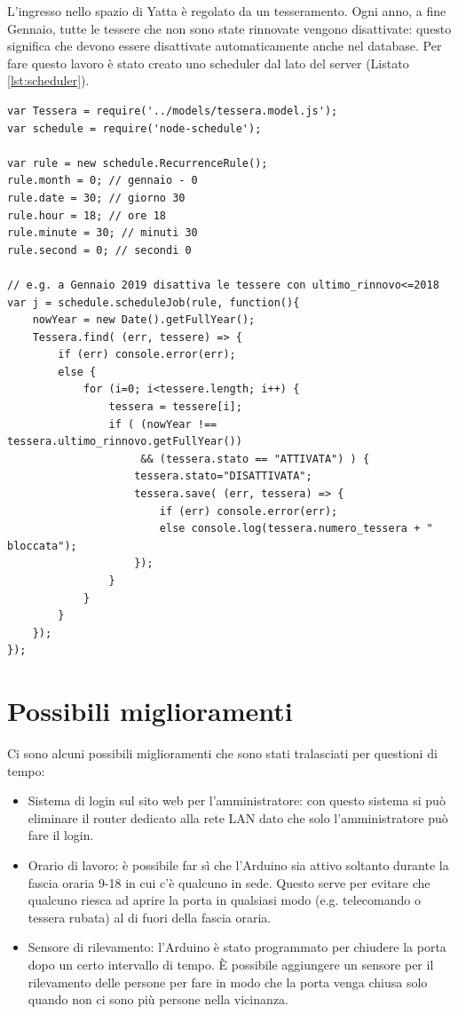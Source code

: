 \documentclass[12pt]{report}
\begin{document}
L'ingresso nello spazio di Yatta è regolato da un tesseramento. Ogni anno, a fine Gennaio, tutte le tessere che non sono state rinnovate vengono disattivate: questo significa che devono essere disattivate automaticamente anche nel database.
Per fare questo lavoro è stato creato uno scheduler dal lato del server (Listato \ref{lst:scheduler}).
\begin{lstlisting}[caption={Implementazione di uno scheduler che disattiva automaticamente le tessere non rinnovate. Questa funzione viene eseguita una volta all'anno e disattiva tutte le tessere ancora attivate e non iscritte all'anno corrente.}, label={lst:scheduler}]
var Tessera = require('../models/tessera.model.js');
var schedule = require('node-schedule');

var rule = new schedule.RecurrenceRule();
rule.month = 0; // gennaio - 0
rule.date = 30; // giorno 30
rule.hour = 18; // ore 18
rule.minute = 30; // minuti 30
rule.second = 0; // secondi 0

// e.g. a Gennaio 2019 disattiva le tessere con ultimo_rinnovo<=2018
var j = schedule.scheduleJob(rule, function(){
	nowYear = new Date().getFullYear();
	Tessera.find( (err, tessere) => {
		if (err) console.error(err);
		else {
			for (i=0; i<tessere.length; i++) {
				tessera = tessere[i];
				if ( (nowYear !== tessera.ultimo_rinnovo.getFullYear()) 
				     && (tessera.stato == "ATTIVATA") ) {
					tessera.stato="DISATTIVATA";
					tessera.save( (err, tessera) => {
						if (err) console.error(err);
						else console.log(tessera.numero_tessera + " bloccata");
					});
				}
			}
		}
	});
});
\end{lstlisting}

%
\section{Possibili miglioramenti}
%

Ci sono alcuni possibili miglioramenti che sono stati tralasciati per questioni di tempo:

\begin{itemize}
	\item Sistema di login sul sito web per l'amministratore: con questo sistema si può eliminare il router dedicato alla rete LAN dato che solo l'amministratore può fare il login. 
	\item Orario di lavoro: è possibile far sì che l'Arduino sia attivo soltanto durante la fascia oraria 9-18 in cui c'è qualcuno in sede. Questo serve per evitare che qualcuno riesca ad aprire la porta in qualsiasi modo (e.g. telecomando o tessera rubata) al di fuori della fascia oraria.
	\item Sensore di rilevamento: l'Arduino è stato programmato per chiudere la porta dopo un certo intervallo di tempo. È possibile aggiungere un sensore per il rilevamento delle persone per fare in modo che la porta venga chiusa solo quando non ci sono più persone nella vicinanza.
\end{itemize}
\end{document}
